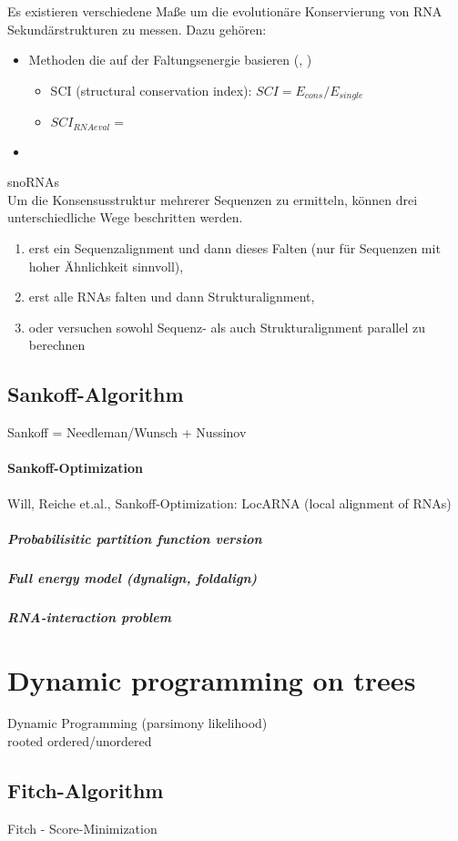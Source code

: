 \documentclass[%
   final,      %
   paper=a4,%
   paper=portrait, %
   pagesize=auto, %
   fontsize=11pt,%
 ]{scrreprt} %
\begin{document}
Es existieren verschiedene Maße um die evolutionäre Konservierung von RNA Sekundärstrukturen zu messen. Dazu gehören:
\begin{itemize}
 \item Methoden die auf der Faltungsenergie basieren (, )
  \begin{itemize}
  \item SCI (structural conservation index): $SCI = E_{cons}/E_{single}$
  \item $SCI_{RNAeval} = $
  \end{itemize}
 \item 
\end{itemize}
snoRNAs\\
Um die Konsensusstruktur mehrerer Sequenzen zu ermitteln, können drei unterschiedliche Wege beschritten werden.
\begin{enumerate}
	\item erst ein Sequenzalignment und dann dieses Falten (nur für Sequenzen mit hoher Ähnlichkeit sinnvoll),
	\item erst alle RNAs falten und dann Strukturalignment,
	\item oder versuchen sowohl Sequenz- als auch Strukturalignment parallel zu berechnen
\end{enumerate}

\subsection{Sankoff-Algorithm}
Sankoff = Needleman/Wunsch + Nussinov\\
\paragraph{Sankoff-Optimization}
Will, Reiche et.al., Sankoff-Optimization: LocARNA (local alignment of RNAs)

\subparagraph{Probabilisitic partition function version}
\subparagraph{Full energy model (dynalign, foldalign)}
\subparagraph{RNA-interaction problem}

\section{Dynamic programming on trees}
Dynamic Programming (parsimony likelihood)\\
rooted ordered/unordered\\

\subsection{Fitch-Algorithm}
Fitch - Score-Minimization
\end{document}
